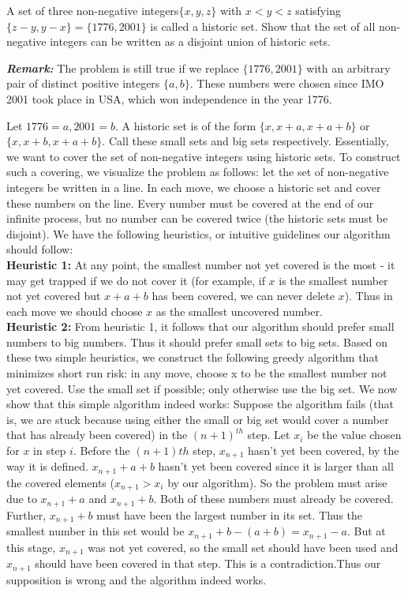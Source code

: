 \documentclass[a4paper,11pt]{book}
\begin{document}
\begin{example}
A set of three non-negative integers$ \{x, y, z \}$ with $x < y < z$ satisfying $\{z-y, y-x\} = \{1776, 2001\}$ is called a historic set. Show that the set of all non-negative integers can be written as a disjoint union of historic sets.
\end{example}
\textbf{ \textit{Remark:}} The problem is still true if we replace $\{1776, 2001 \}$ with an arbitrary pair of distinct positive integers $\{a, b\}.$ These numbers were chosen since IMO 2001 took place in USA, which won independence in the year 1776.
\begin{soln}
Let $1776 = a, 2001 =b.$ A historic set is of the form $\{x, x+a, x+a+b\}$
or $\{x, x+b, x+a+b\}.$ Call these small sets and big sets respectively.
Essentially, we want to cover the set of non-negative integers using
historic sets. To construct such a covering, we visualize the
problem as follows: let the set of non-negative integers be written
in a line. In each move, we choose a historic set and cover these
numbers on the line. Every number must be covered at the end of
our infinite process, but no number can be covered twice (the
historic sets must be disjoint). We have the following heuristics, or
intuitive guidelines our algorithm should follow:\\
\textbf{ Heuristic 1:} At any point, the smallest number not yet covered is
the most - it may get trapped if we do not cover it (for
example, if $x$ is the smallest number not yet covered but $x+a+b$ has
been covered, we can never delete $x$). Thus in each move we
should choose $x$ as the smallest uncovered number.\\
\textbf{ Heuristic 2: } From heuristic 1, it follows that our algorithm should
prefer small numbers to big numbers. Thus it should prefer small
sets to big sets.
Based on these two simple heuristics, we construct the
following greedy algorithm that minimizes short run risk: in any
move, choose x to be the smallest number not yet covered. Use
the small set if possible; only otherwise use the big set. We now
show that this simple algorithm indeed works:
Suppose the algorithm fails (that is, we are stuck because using
either the small or big set would cover a number that has already
been covered) in the $(n+1)^{th}$ step. Let $ x_i$ be the value chosen for $x$
in step $i.$ Before the $(n+1){th}$ step, $ x_{n+1}$ hasn’t yet been covered, by the way it is defined. $x_{n+1} + a + b$ hasn’t yet been covered since it is
larger than all the covered elements ($x_{n+1} > x_i$ by our algorithm). So the problem must arise due to $x_{n+1} + a$ and  $x_{n+1} + b.$ Both of these
numbers must already be covered. Further, $x_{n+1} + b$ must have
been the largest number in its set. Thus the smallest number in this set would be $x_{n+1} + b - (a+b) = x_{n+1} - a.$ But at this stage, $x_{n+1}$
was not yet covered, so the small set should have been used and $x_{n+1}$ should have been covered in that step. This is a contradiction.Thus our supposition is wrong and the algorithm indeed works.
\end{soln}
\end{document}
